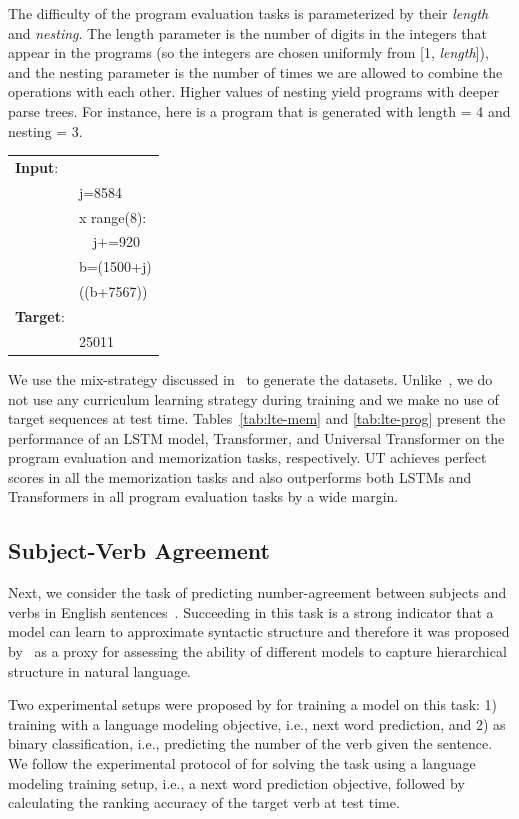 The difficulty of the program evaluation tasks is parameterized by their \textit{length} and \textit{nesting}. The
length parameter is the number of digits in the integers that appear in the programs (so the integers are chosen uniformly from [1, \emph{length}]), and the nesting parameter is the number of times we are allowed to combine the operations with each
other. Higher values of nesting yield programs with deeper parse trees.
For instance, here is a program that is generated with length = 4 and
nesting = 3. 
\begin{table}[h!]
\fontsize{8}{8}\selectfont
\begin{tabular}{l l}
\textbf{Input}: & \\
& j=8584 \\
& {\color{blue}{for}} x {\color{blue}{in}} range(8): \\
& ~~j+=920 \\
& b=(1500+j) \\
& {\color{blue}{print}}((b+7567)) \\
\textbf{Target}: & \\
& 25011
\end{tabular}
\end{table}


We use the mix-strategy discussed in~\citep{ZS14} to generate the datasets. Unlike~\citep{ZS14}, we do not use any curriculum learning strategy during training and we make no use of target sequences at test time. Tables~\ref{tab:lte-mem} and \ref{tab:lte-prog} present the performance of an LSTM model, Transformer, and Universal Transformer on the program evaluation and memorization tasks, respectively. UT achieves perfect scores in all the memorization tasks and also outperforms both LSTMs and Transformers in all program evaluation tasks by a wide margin. 


\subsection{Subject-Verb Agreement}
Next, we consider the task of predicting number-agreement between subjects and verbs in English sentences~\citep{linzen2016assessing}. Succeeding in this task is a strong indicator that a model can learn to approximate syntactic structure and therefore it was proposed by~\citet{linzen2016assessing} as a proxy for assessing the ability of different models to capture hierarchical structure in natural language. 

Two experimental setups were proposed by \citet{linzen2016assessing} for training a model on this task: 1) training with a language modeling objective, i.e., next word prediction, and 2) as binary classification, i.e., predicting the number of the verb given the sentence. 
We follow the experimental protocol of \citet{linzen2016assessing} for solving the task using a language modeling training setup, i.e., a next word prediction objective, followed by calculating the ranking accuracy of the target verb at test time. 

